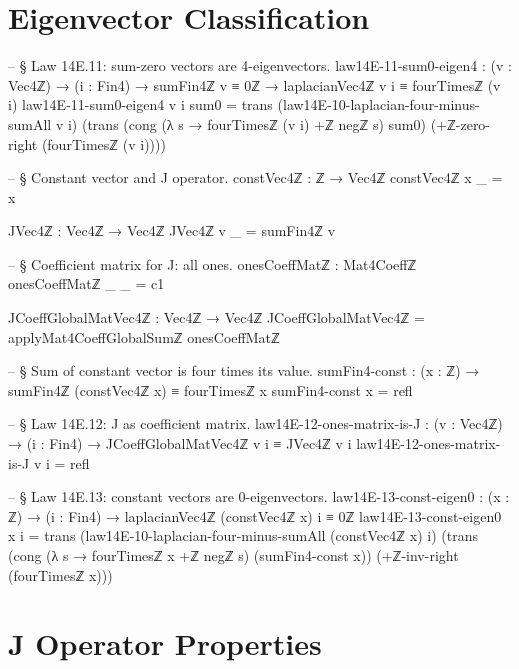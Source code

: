 \documentclass[11pt,a4paper]{book}
\def\texorpdfstring#1#2{#2}%
\begin{document}
\section{Eigenvector Classification}

\begin{code}
-- § Law 14E.11: sum-zero vectors are 4-eigenvectors.
law14E-11-sum0-eigen4 : (v : Vec4ℤ) → (i : Fin4) → sumFin4ℤ v ≡ 0ℤ →
  laplacianVec4ℤ v i ≡ fourTimesℤ (v i)
law14E-11-sum0-eigen4 v i sum0 =
  trans
    (law14E-10-laplacian-four-minus-sumAll v i)
    (trans
      (cong (λ s → fourTimesℤ (v i) +ℤ negℤ s) sum0)
      (+ℤ-zero-right (fourTimesℤ (v i))))

-- § Constant vector and J operator.
constVec4ℤ : ℤ → Vec4ℤ
constVec4ℤ x _ = x

JVec4ℤ : Vec4ℤ → Vec4ℤ
JVec4ℤ v _ = sumFin4ℤ v

-- § Coefficient matrix for J: all ones.
onesCoeffMatℤ : Mat4Coeffℤ
onesCoeffMatℤ _ _ = c1

JCoeffGlobalMatVec4ℤ : Vec4ℤ → Vec4ℤ
JCoeffGlobalMatVec4ℤ = applyMat4CoeffGlobalSumℤ onesCoeffMatℤ

-- § Sum of constant vector is four times its value.
sumFin4-const : (x : ℤ) → sumFin4ℤ (constVec4ℤ x) ≡ fourTimesℤ x
sumFin4-const x = refl

-- § Law 14E.12: J as coefficient matrix.
law14E-12-ones-matrix-is-J : (v : Vec4ℤ) → (i : Fin4) →
  JCoeffGlobalMatVec4ℤ v i ≡ JVec4ℤ v i
law14E-12-ones-matrix-is-J v i = refl

-- § Law 14E.13: constant vectors are 0-eigenvectors.
law14E-13-const-eigen0 : (x : ℤ) → (i : Fin4) →
  laplacianVec4ℤ (constVec4ℤ x) i ≡ 0ℤ
law14E-13-const-eigen0 x i =
  trans
    (law14E-10-laplacian-four-minus-sumAll (constVec4ℤ x) i)
    (trans
      (cong (λ s → fourTimesℤ x +ℤ negℤ s) (sumFin4-const x))
      (+ℤ-inv-right (fourTimesℤ x)))
\end{code}

\section{\texorpdfstring{$J$}{J} Operator Properties}
\end{document}
